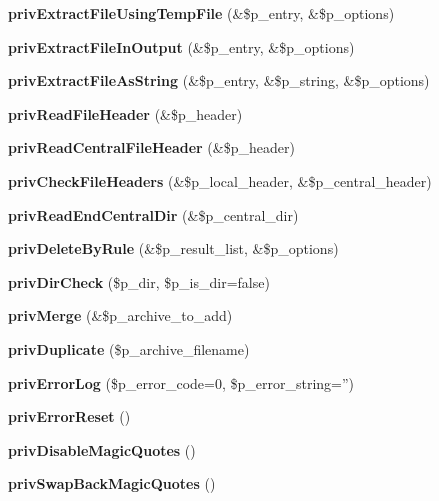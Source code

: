 \begin{DoxyCompactItemize}
\item 
{\bfseries priv\+Extract\+File\+Using\+Temp\+File} (\&\$p\+\_\+entry, \&\$p\+\_\+options)\label{class_pcl_zip_ac50777d7f27a9c486abd474bf785d316}

\item 
{\bfseries priv\+Extract\+File\+In\+Output} (\&\$p\+\_\+entry, \&\$p\+\_\+options)\label{class_pcl_zip_ae1e9a6161530c108bf1b32db16e27c99}

\item 
{\bfseries priv\+Extract\+File\+As\+String} (\&\$p\+\_\+entry, \&\$p\+\_\+string, \&\$p\+\_\+options)\label{class_pcl_zip_af7e8e7e6fa982a0b59121371e4b08af3}

\item 
{\bfseries priv\+Read\+File\+Header} (\&\$p\+\_\+header)\label{class_pcl_zip_ab8a4754ff888b3b86fc0753bcca2c60e}

\item 
{\bfseries priv\+Read\+Central\+File\+Header} (\&\$p\+\_\+header)\label{class_pcl_zip_a1c466fd714e5e340e5557c5964b7ee59}

\item 
{\bfseries priv\+Check\+File\+Headers} (\&\$p\+\_\+local\+\_\+header, \&\$p\+\_\+central\+\_\+header)\label{class_pcl_zip_ac787ad20a377ce09581b5cbdcf6d0825}

\item 
{\bfseries priv\+Read\+End\+Central\+Dir} (\&\$p\+\_\+central\+\_\+dir)\label{class_pcl_zip_a909c911c7006522fbd26911b4fc78c38}

\item 
{\bfseries priv\+Delete\+By\+Rule} (\&\$p\+\_\+result\+\_\+list, \&\$p\+\_\+options)\label{class_pcl_zip_ac21c7d0ec65a03bfd942ab89d6a434bf}

\item 
{\bfseries priv\+Dir\+Check} (\$p\+\_\+dir, \$p\+\_\+is\+\_\+dir=false)\label{class_pcl_zip_a5f81721c3c726a80eda3ffb6ae7bd4a2}

\item 
{\bfseries priv\+Merge} (\&\$p\+\_\+archive\+\_\+to\+\_\+add)\label{class_pcl_zip_a12737ab59b43ffd32060d05d7163c601}

\item 
{\bfseries priv\+Duplicate} (\$p\+\_\+archive\+\_\+filename)\label{class_pcl_zip_adb79a54d5c9111906a7e96f628242373}

\item 
{\bfseries priv\+Error\+Log} (\$p\+\_\+error\+\_\+code=0, \$p\+\_\+error\+\_\+string='')\label{class_pcl_zip_ae93909de718392884b09bd46fb8f7249}

\item 
{\bfseries priv\+Error\+Reset} ()\label{class_pcl_zip_ac5af7b6471e22f647ccbdb69e9ebbcf6}

\item 
{\bfseries priv\+Disable\+Magic\+Quotes} ()\label{class_pcl_zip_a846e6d140e69138a93ed841df99d4fe1}

\item 
{\bfseries priv\+Swap\+Back\+Magic\+Quotes} ()\label{class_pcl_zip_a564776cffdcda27ecfd4d64fd997dd2d}

\end{DoxyCompactItemize}
